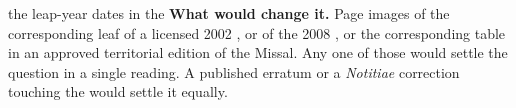 \begin{synthesis}{the leap-year dates in the }
\textbf{What would change it.} Page images of the corresponding leaf of a licensed 2002
, or of the 2008 , or the corresponding table
in an approved territorial edition of the Missal. Any one of those would settle the question in a
single reading. A published erratum or a \emph{Notitiae} correction touching the
 would settle it equally.
\end{synthesis}
